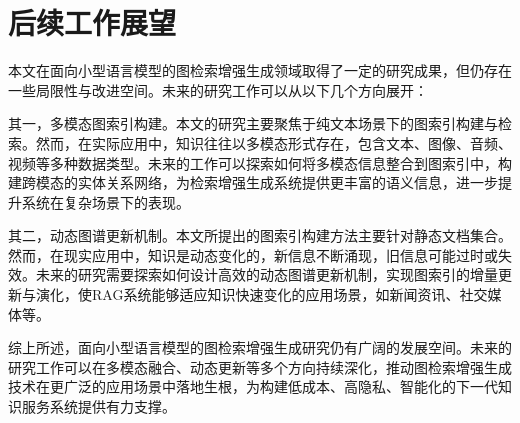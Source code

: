 \documentclass[promaster, vlined]{DissertUESTC}
\begin{document}
\section{后续工作展望}

本文在面向小型语言模型的图检索增强生成领域取得了一定的研究成果，但仍存在一些局限性与改进空间。未来的研究工作可以从以下几个方向展开：

其一，多模态图索引构建。本文的研究主要聚焦于纯文本场景下的图索引构建与检索。然而，在实际应用中，知识往往以多模态形式存在，包含文本、图像、音频、视频等多种数据类型。未来的工作可以探索如何将多模态信息整合到图索引中，构建跨模态的实体关系网络，为检索增强生成系统提供更丰富的语义信息，进一步提升系统在复杂场景下的表现。

其二，动态图谱更新机制。本文所提出的图索引构建方法主要针对静态文档集合。然而，在现实应用中，知识是动态变化的，新信息不断涌现，旧信息可能过时或失效。未来的研究需要探索如何设计高效的动态图谱更新机制，实现图索引的增量更新与演化，使RAG系统能够适应知识快速变化的应用场景，如新闻资讯、社交媒体等。

综上所述，面向小型语言模型的图检索增强生成研究仍有广阔的发展空间。未来的研究工作可以在多模态融合、动态更新等多个方向持续深化，推动图检索增强生成技术在更广泛的应用场景中落地生根，为构建低成本、高隐私、智能化的下一代知识服务系统提供有力支撑。


\end{document}
